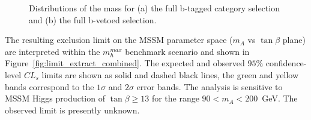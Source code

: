 \begin{figure}[tp]
     \begin{center}

    \end{center}
    \caption{Distributions of the \mmc mass for (a) the full b-tagged category selection and (b) the full b-vetoed selection.}
   \label{fig:mmc_categories}
\end{figure}


The resulting exclusion limit on the MSSM parameter space ($m_A$ vs $\tan\beta$ plane) are interpreted 
within the $m_{h}^{max}$ benchmark scenario \cite{MSSMmhmax} and  shown in 
%
Figure~\ref{fig:limit_extract_combined}. %
%
The expected and observed $95\%$ confidence-level $CL_s$  limits are shown as solid and dashed black lines, the green 
and yellow bands correspond to the $1\sigma$ and $2\sigma$ error bands. 
The analysis is sensitive to MSSM Higgs production of $\tan\beta \geq 13$ for the range $90<m_A<200$~GeV.
The observed limit is presently unknown. %


